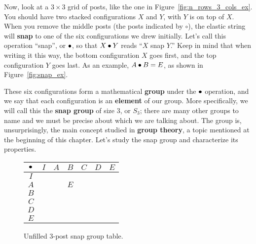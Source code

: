 \documentclass[../gatm.tex]{subfiles}
\begin{document}
Now, look at a $3\times 3$ grid of posts, like the one in Figure~\ref{fig:n_rows_3_cols_ex}.
You should have two stacked configurations $X$ and $Y$, with $Y$ is on top of $X$.
When you remove the middle posts (the posts indicated by $\circ$), the elastic string will \textbf{snap} to one of the six configurations we drew initially.
Let's call this operation ``snap'', or $\bullet$, so that $X\bullet Y$ reads ``$X$ snap $Y$.''
Keep in mind that when writing it this way, the bottom configuration $X$ goes first, and the top configuration $Y$ goes last.
As an example, $A\bullet B = E$, as shown in Figure~\ref{fig:snap_ex}.

These six configurations form a mathematical \textbf{group} under the $\bullet$ operation, and we say that each configuration is an \textbf{element} of our group.
More specifically, we will call this the \textbf{snap group} of size $3$, or $S_3$; there are many other groups to name and we must be precise about which we are talking about.
The group is, unsurprisingly, the main concept studied in \textbf{group theory}, a topic mentioned at the beginning of this chapter.
Let's study the snap group and characterize its properties.

\begin{figure}
	\centering
	\begin{center}
		\begin{tabular}{c|cccccc}
			\hline
			$\bullet$ & $I$ & $A$ & $B$ & $C$ & $D$ & $E$ \\ \hline
			\rowcolor{light-gray}
			$I$    &   &   &   &   &   &   \\ 
			$A$    &   &   & $E$ &   &   &   \\ 
			\rowcolor{light-gray}
			$B$    &   &   &   &   &   &   \\ 
			$C$    &   &   &   &   &   &   \\ 
			\rowcolor{light-gray}
			$D$    &   &   &   &   &   &   \\ 
			$E$    &   &   &   &   &   &   \\ \hline
		\end{tabular}
		\caption{Unfilled $3$-post snap group table.}
		\label{fig:sbstable}
	\end{center}
\end{figure}
\end{document}
